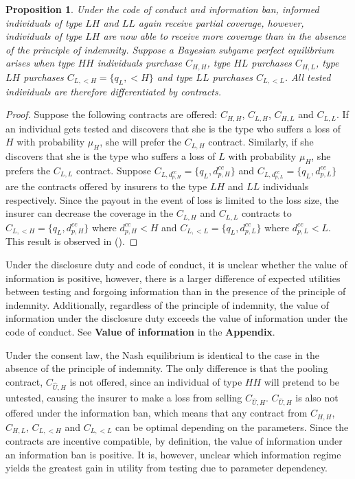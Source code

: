 \documentclass[natbib=false,preprint,12pt]{elsarticle}
\theoremstyle{plain}
\newtheorem{prop}[theorem]{Proposition}
\theoremstyle{definition}
\theoremstyle{plain}
\theoremstyle{TheoremNum}
\theoremstyle{CorollaryNum}
\theoremstyle{PropositionNum}
\theoremstyle{TheoremNum}
\begin{document}
\setcounter{theorem}{9}
\renewcommand{\thetheorem}{\arabic{theorem}}
\begin{prop}
Under the code of conduct and information ban, informed individuals of type $LH$ and $LL$ again receive partial coverage, however, individuals of type $LH$ are now able to receive more coverage than in the absence of the principle of indemnity. Suppose a Bayesian subgame perfect equilibrium arises when type $HH$ individuals purchase $C_{H,H}$, type $HL$ purchases $C_{H,L}$, type $LH$ purchases $C_{L,<H} = \{q_L,<H\}$ and type $LL$ purchases $C_{L,<L}$. All tested individuals are therefore differentiated by contracts.
\end{prop}

\begin{proof}
Suppose the following contracts are offered: $C_{H,H}$, $C_{L,H}$, $C_{H,L}$ and $C_{L,L}$. If an individual gets tested and discovers that she is the type who suffers a loss of $H$ with probability $\mu_H$, she will prefer the $C_{L,H}$ contract. Similarly, if she discovers that she is the type who suffers a loss of $L$ with probability $\mu_H$, she prefers the $C_{L,L}$ contract. Suppose $C_{L,d_{p,H}^{cc}} = \{q_L,d_{p,H}^{cc}\}$ and $C_{L, d_{p,L}^{cc}} = \{q_L, d_{p,L}^{cc}\}$ are the contracts offered by insurers to the type $LH$ and $LL$ individuals respectively. Since the payout in the event of loss is limited to the loss size, the insurer can decrease the coverage in the $C_{L,H}$ and $C_{L,L}$ contracts to $C_{L,<H} = \{q_L, d_{p,H}^{cc}\}$ where $d_{p,H}^{cc} < H$ and $C_{L,<L} = \{q_L, d_{p,L}^{cc}\}$ where $d_{p,L}^{cc}<L$. This result is observed in \citeauthor*{peter2017endogenous} (\citeyear{peter2017endogenous}). 
\end{proof}

Under the disclosure duty and code of conduct, it is unclear whether the value of information is positive, however, there is a larger difference of expected utilities between testing and forgoing information than in the presence of the principle of indemnity. Additionally, regardless of the principle of indemnity, the value of information under the disclosure duty exceeds the value of information under the code of conduct. See \textbf{Value of information} in the \textbf{Appendix}. 

Under the consent law, the Nash equilibrium is identical to the case in the absence of the principle of indemnity. The only difference is that the pooling contract, $C_{\widehat{U},H}$ is not offered, since an individual of type $HH$ will pretend to be untested, causing the insurer to make a loss from selling $C_{\widehat{U},H}$. $C_{\widehat{U},H}$ is also not offered under the information ban, which means that any contract from $C_{H,H}$, $C_{H,L}$, $C_{L,<H}$ and $C_{L,<L}$ can be optimal depending on the parameters. Since the contracts are incentive compatible, by definition, the value of information under an information ban is positive. It is, however, unclear which information regime yields the greatest gain in utility from testing due to parameter dependency.
\end{document}
